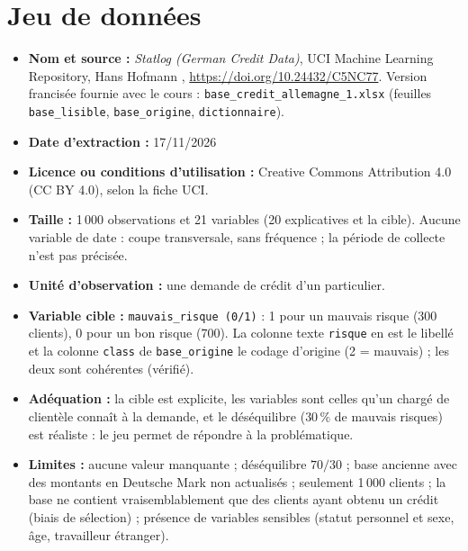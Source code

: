 \documentclass[12pt,a4paper]{article}
\begin{document}
\section{Jeu de données}\label{sec:data}
\begin{itemize}
\item \textbf{Nom et source :} \emph{Statlog (German Credit Data)}, UCI Machine Learning Repository, Hans Hofmann \cite{hofmann}, \url{https://doi.org/10.24432/C5NC77}. Version francisée fournie avec le cours : \texttt{base\_credit\_allemagne\_1.xlsx} (feuilles \texttt{base\_lisible}, \texttt{base\_origine}, \texttt{dictionnaire}).
\item \textbf{Date d’extraction :} {17/11/2026}
\item \textbf{Licence ou conditions d’utilisation :} Creative Commons Attribution 4.0 (CC BY 4.0), selon la fiche UCI.
\item \textbf{Taille :} 1\,000 observations et 21 variables (20 explicatives et la cible). Aucune variable de date : coupe transversale, sans fréquence ; la période de collecte n’est pas précisée.
\item \textbf{Unité d’observation :} une demande de crédit d’un particulier.
\item \textbf{Variable cible :} \texttt{mauvais\_risque (0/1)} : 1 pour un mauvais risque (300 clients), 0 pour un bon risque (700). La colonne texte \texttt{risque} en est le libellé et la colonne \texttt{class} de \texttt{base\_origine} le codage d’origine (2 = mauvais) ; les deux sont cohérentes (vérifié).
\item \textbf{Adéquation :} la cible est explicite, les variables sont celles qu’un chargé de clientèle connaît à la demande, et le déséquilibre ($30\,\%$ de mauvais risques) est réaliste : le jeu permet de répondre à la problématique.
\item \textbf{Limites :} aucune valeur manquante ; déséquilibre $70/30$ ; base ancienne avec des montants en Deutsche Mark non actualisés ; seulement 1\,000 clients ; la base ne contient vraisemblablement que des clients ayant obtenu un crédit (biais de sélection) ; présence de variables sensibles (statut personnel et sexe, âge, travailleur étranger).
\end{itemize}
\end{document}
